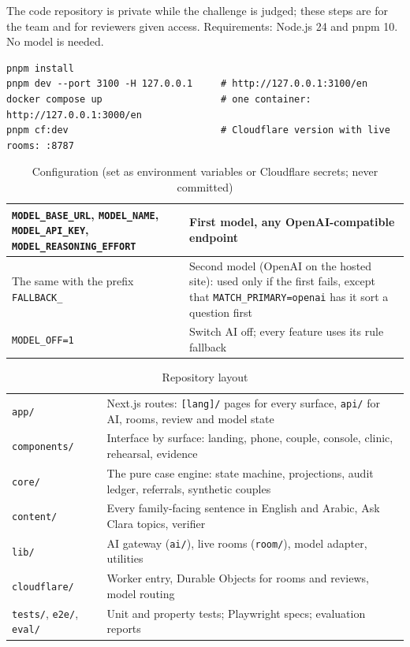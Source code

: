 \documentclass[10.5pt,a4paper]{article}
\newcommand{\toprl}{\arrayrulecolor{ink}\toprule\arrayrulecolor{rule}}
\newcommand{\code}[1]{\texttt{\small #1}}
\begin{document}
The code repository is private while the challenge is judged; these steps are for the team and for reviewers given
access. Requirements: Node.js 24 and pnpm 10. No model is needed.

\begin{Verbatim}
pnpm install
pnpm dev --port 3100 -H 127.0.0.1     # http://127.0.0.1:3100/en
docker compose up                     # one container: http://127.0.0.1:3000/en
pnpm cf:dev                           # Cloudflare version with live rooms: :8787
\end{Verbatim}

{\small
\begin{xltabular}{\textwidth}{@{}P{7.2cm}L@{}}
\caption{Configuration (set as environment variables or Cloudflare secrets; never committed)}\\
\toprl
\code{MODEL\_BASE\_URL}, \code{MODEL\_NAME}, \code{MODEL\_API\_KEY}, \code{MODEL\_REASONING\_EFFORT} & First model, any OpenAI-compatible endpoint\\
\midrule
The same with the prefix \code{FALLBACK\_} & Second model (OpenAI on the hosted site): used only if the first fails, except that \code{MATCH\_PRIMARY=openai} has it sort a question first\\
\midrule
\code{MODEL\_OFF=1} & Switch AI off; every feature uses its rule fallback\\
\bottomrule
\end{xltabular}}

{\small
\begin{xltabular}{\textwidth}{@{}P{2.6cm}L@{}}
\caption{Repository layout}\\
\toprl
\code{app/} & Next.js routes: \code{[lang]/} pages for every surface, \code{api/} for AI, rooms, review and model state\\
\code{components/} & Interface by surface: landing, phone, couple, console, clinic, rehearsal, evidence\\
\code{core/} & The pure case engine: state machine, projections, audit ledger, referrals, synthetic couples\\
\code{content/} & Every family-facing sentence in English and Arabic, Ask Clara topics, verifier\\
\code{lib/} & AI gateway (\code{ai/}), live rooms (\code{room/}), model adapter, utilities\\
\code{cloudflare/} & Worker entry, Durable Objects for rooms and reviews, model routing\\
\code{tests/}, \code{e2e/}, \code{eval/} & Unit and property tests; Playwright specs; evaluation reports\\
\bottomrule
\end{xltabular}}
\end{document}

